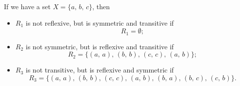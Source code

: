 If we have a set $X = \{ a, \, b, \, c\}$, then
\begin{itemize}
	\item $R_1$ is not reflexive, but is symmetric and transitive if
	\[
		R_1 = \emptyset;
	\]
	\item $R_2$ is not symmetric, but is reflexive and transitive if
	\[
		R_2 = \{ (a, \, a), \, (b, \, b), \, (c, \, c), \, (a, \, b)\};
	\]
	\item $R_3$ is not transitive, but is reflexive and symmetric if
	\[
		R_3 = \{ (a, \, a), \, (b, \, b), \, (c, \, c), \, (a, \, b), \, (b, \, a), \, (b, \, c), \, (c, \, b)\}.
	\]
\end{itemize}